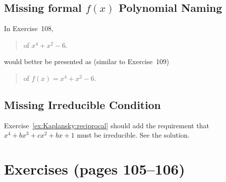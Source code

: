 \subsection{Missing formal \ensuremath{f(x)} Polynomial Naming}
            \label{ss:mis:polynam}


In Exercise~108,
\begin{quotation}
\mldots of \(x^4+x^2-6\).
\end{quotation}
would better be presented as (similar to Exercise~109)
\begin{quotation}
\mldots of \(f(x) = x^4+x^2-6\).
\end{quotation}


\subsection{Missing Irreducible Condition} \label{ss:miss:irr}

Exercise~\ref{ex:Kaplansky:reciprocal}
should add the requirement that
\(x^4 + bx^3 + cx^2 + bx + 1\) must be irreducible.
See the solution.


\section{Exercises (pages 105--106)}

